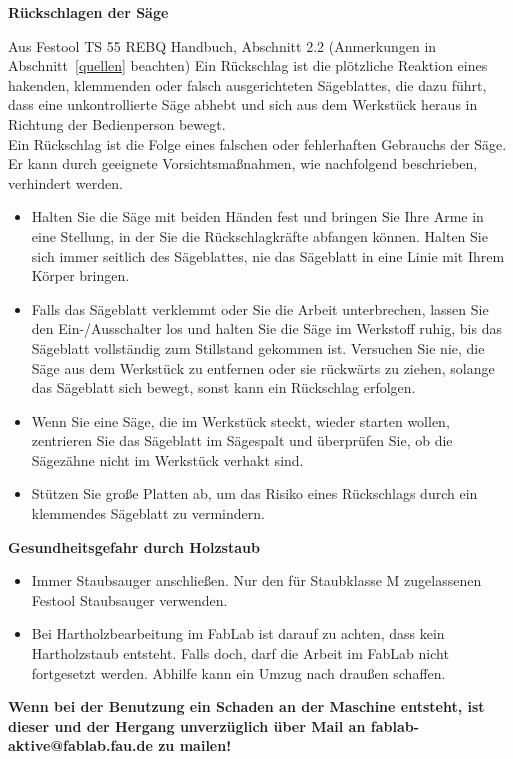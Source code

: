 \documentclass{\basedir/fablab-document}
\begin{document}
\textbf{Rückschlagen der Säge}
\begin{leftbar}{Aus Festool TS 55 REBQ Handbuch, Abschnitt 2.2 (Anmerkungen in Abschnitt~\ref{quellen} beachten)}
Ein Rückschlag ist die plötzliche Reaktion
eines hakenden, klemmenden oder falsch
ausgerichteten Sägeblattes, die dazu führt,
dass eine unkontrollierte Säge abhebt und
sich aus dem Werkstück heraus in Richtung der Bedienperson bewegt.\\
Ein Rückschlag ist die Folge eines falschen
oder fehlerhaften Gebrauchs der Säge. Er kann
durch geeignete Vorsichtsmaßnahmen, wie
nachfolgend beschrieben, verhindert werden.
\begin{itemize}
\item Halten Sie die Säge mit beiden Händen
fest und bringen Sie Ihre Arme in eine
Stellung, in der Sie die Rückschlagkräfte
abfangen können. Halten Sie sich immer
seitlich des Sägeblattes, nie das Sägeblatt
in eine Linie mit Ihrem Körper bringen. 
\item Falls das Sägeblatt verklemmt oder Sie
die Arbeit unterbrechen, lassen Sie den
Ein-/Ausschalter los und halten Sie die
Säge im Werkstoff ruhig, bis das Sägeblatt
vollständig zum Stillstand gekommen ist.
Versuchen Sie nie, die Säge aus dem
Werkstück zu entfernen oder sie rückwärts zu ziehen, solange das Sägeblatt
sich bewegt, sonst kann ein Rückschlag
erfolgen.
\item Wenn Sie eine Säge, die im Werkstück
steckt, wieder starten wollen, zentrieren
Sie das Sägeblatt im Sägespalt und überprüfen Sie, ob die Sägezähne nicht im
Werkstück verhakt sind. 
\item Stützen Sie große Platten ab, um das Risiko eines Rückschlags durch ein klemmendes Sägeblatt zu vermindern.

\end{itemize}
\end{leftbar}

\textbf{Gesundheitsgefahr durch Holzstaub}
\begin{itemize}
	\item Immer Staubsauger anschließen. Nur den für Staubklasse M zugelassenen Festool Staubsauger verwenden.
	\item Bei Hartholzbearbeitung im FabLab ist darauf zu achten, dass kein Hartholzstaub entsteht. Falls doch, darf die Arbeit im FabLab nicht fortgesetzt werden. Abhilfe kann ein Umzug nach draußen schaffen.
\end{itemize}

\textbf{Wenn bei der Benutzung ein Schaden an der Maschine entsteht, ist dieser und der Hergang unverzüglich über Mail an fablab-aktive@fablab.fau.de zu mailen!}
\end{document}
